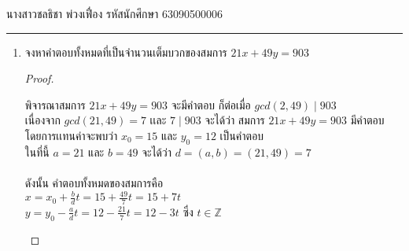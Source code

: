 \documentclass[12pt, a4paper]{article}
\begin{document}
\raggedleft นางสาวชลธิชา พ่วงเฟื่อง   รหัสนักศึกษา 63090500006 \\[12pt]
\hrule\vspace{12pt}
\raggedright

\begin{enumerate}
    \item จงหาคำตอบทั้งหมดที่เป็นจำนวนเต็มบวกของสมการ $21x+49y=903$\\ 
    
    
    \begin{proof}
        \begin{enumerate}พิจารณาสมการ $21x+49y=903$ จะมีคำตอบ ก็ต่อเมื่อ $gcd(2,49)\mid 903$\\
            เนื่องจาก $gcd(21,49)=7$ เเละ $7\mid 903$ จะได้ว่า สมการ  $21x+49y=903$  มีคำตอบ\\
            โดยการเเทนค่าจะพบว่า $x_0=15$ และ $y_0=12$ เป็นคำตอบ\\
            ในที่นี้ $a=21$ และ $b=49$ จะได้ว่า $d=(a,b)=(21,49)=7$
            \\\indent\\ดังนั้น คำตอบทั้งหมดของสมการคือ\\
                $x=x_{0}+\frac{b}{d}t=15+\frac{49}{7}t=15+7t$\\
                $y=y_{0}-\frac{a}{d}t=12-\frac{21}{7}t=12-3t$    ซึ่ง $t\in \mathbb{Z}$
              
        \end{enumerate}
    \end{proof}

\end{enumerate}
\end{document}
